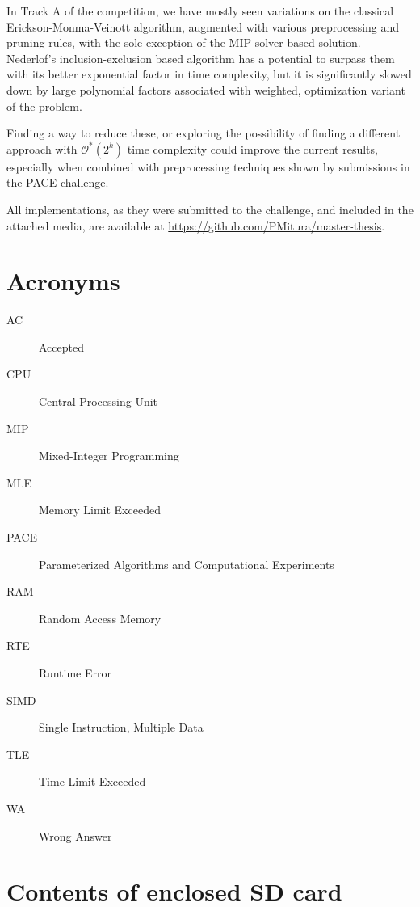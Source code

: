 \documentclass[thesis=M,english,hidelinks]{FITthesis}[2012/10/20]
\theoremstyle{definition}
\begin{document}
In Track A of the competition, we have mostly seen variations on the classical Erickson-Monma-Veinott algorithm,
augmented with various preprocessing and pruning rules, with the sole exception of the MIP solver based solution.
Nederlof's inclusion-exclusion based algorithm has a potential to surpass them with its better exponential factor in
time complexity, but it is significantly slowed down by large polynomial factors associated with weighted, optimization
variant of the problem. 

Finding a way to reduce these, or exploring the possibility of finding a different approach with $\mathcal{O}^*(2^k)$
time complexity could improve the current results, especially when combined with preprocessing techniques shown by
submissions in the PACE challenge.

\medskip

All implementations, as they were submitted to the challenge, and included in the attached media, are available at
\url{https://github.com/PMitura/master-thesis}.




\appendix

\chapter{Acronyms}
\begin{description}
    \item[AC] Accepted
    \item[CPU] Central Processing Unit
    \item[MIP] Mixed-Integer Programming
    \item[MLE] Memory Limit Exceeded
    \item[PACE] Parameterized Algorithms and Computational Experiments
    \item[RAM] Random Access Memory
    \item[RTE] Runtime Error
    \item[SIMD] Single Instruction, Multiple Data
    \item[TLE] Time Limit Exceeded
    \item[WA] Wrong Answer
\end{description}


\chapter{Contents of enclosed SD card}
\end{document}
